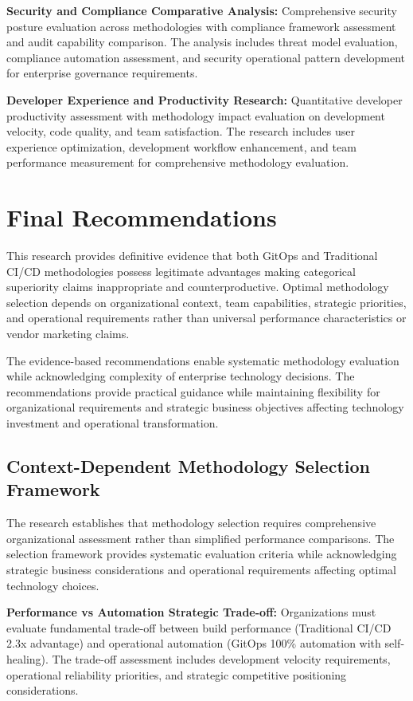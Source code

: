 \textbf{Security and Compliance Comparative Analysis:}
Comprehensive security posture evaluation across methodologies with compliance framework assessment and audit capability comparison. The analysis includes threat model evaluation, compliance automation assessment, and security operational pattern development for enterprise governance requirements.

\textbf{Developer Experience and Productivity Research:}
Quantitative developer productivity assessment with methodology impact evaluation on development velocity, code quality, and team satisfaction. The research includes user experience optimization, development workflow enhancement, and team performance measurement for comprehensive methodology evaluation.

\section{Final Recommendations}
\label{sec:final_recommendations}

This research provides definitive evidence that both GitOps and Traditional CI/CD methodologies possess legitimate advantages making categorical superiority claims inappropriate and counterproductive. Optimal methodology selection depends on organizational context, team capabilities, strategic priorities, and operational requirements rather than universal performance characteristics or vendor marketing claims.

The evidence-based recommendations enable systematic methodology evaluation while acknowledging complexity of enterprise technology decisions. The recommendations provide practical guidance while maintaining flexibility for organizational requirements and strategic business objectives affecting technology investment and operational transformation.

\subsection{Context-Dependent Methodology Selection Framework}
\label{subsec:context_dependent_selection}

The research establishes that methodology selection requires comprehensive organizational assessment rather than simplified performance comparisons. The selection framework provides systematic evaluation criteria while acknowledging strategic business considerations and operational requirements affecting optimal technology choices.

\textbf{Performance vs Automation Strategic Trade-off:}
Organizations must evaluate fundamental trade-off between build performance (Traditional CI/CD 2.3x advantage) and operational automation (GitOps 100\% automation with self-healing). The trade-off assessment includes development velocity requirements, operational reliability priorities, and strategic competitive positioning considerations.

